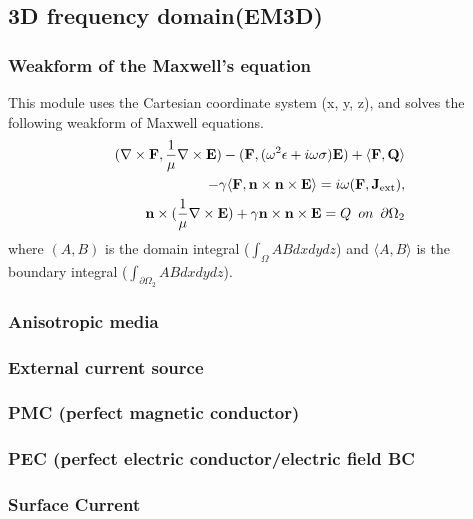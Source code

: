 \documentclass[11pt,a4paper,draft]{report}
\begin{document}
\subsection{3D frequency domain(EM3D)}
\subsubsection{Weakform of the Maxwell's equation}
This module uses the Cartesian coordinate system (x, y, z), and solves the following weakform of Maxwell equations. 
 \begin{align}
(\nabla \times \mathbf{F},  \frac{1}{\mu}\nabla  \times  \mathbf{E})
 - (\mathbf{F},  (\omega^2 \epsilon+ i \omega \sigma)  \mathbf{E}) 
 +  \langle \mathbf{F},  \mathbf{Q} \rangle 
 \notag \\
 - \gamma \langle  \mathbf{F}, \mathbf{n} \times \mathbf{n} \times  \mathbf{E}\rangle = i \omega (\mathbf{F}, \mathbf{J}_{\rm ext} ) ,
\label{em3d_weak} \\
\label{em3d_weakBC} 
 \mathbf{n} \times (\frac{1}{\mu} \nabla \times \mathbf{E}) + \gamma \mathbf{n} \times \mathbf{n} \times  \mathbf{E} = Q\,\,\,on\,\,\,\partial \Omega_{2}
 \end{align}
  where $(A , B)$ is the domain integral ($\int_{\Omega} AB dxdydz$) and $\langle A, B \rangle $ is the boundary integral ($\int_{\partial \Omega_{2}} ABdxdydz$). 
 
 \subsubsection{Anisotropic media}
 
 \subsubsection{External current source}
 
 \subsubsection{PMC (perfect magnetic conductor)}
 
 \subsubsection{PEC (perfect electric conductor/electric field BC}
 
  \subsubsection{Surface Current}
  
\end{document}
